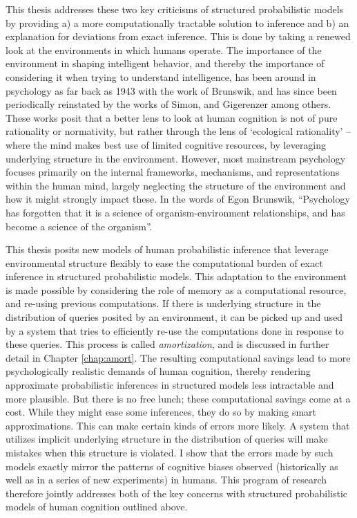 This thesis addresses these two key criticisms of structured probabilistic models by providing a) a more computationally tractable solution to inference and b) an explanation for deviations from exact inference. This is done by taking a renewed look at the environments in which humans operate. The importance of the environment in shaping intelligent behavior, and thereby the importance of considering it when trying to understand intelligence, has been around in psychology as far back as 1943 with the work of Brunswik\citep{brunswik1943organismic}, and has since been periodically reinstated by the works of Simon\citep{simon1956rational}, %
and Gigerenzer \citep{gigerenzer1999simple} among others. These works posit that a better lens to look at human cognition is not of pure rationality or normativity, but rather through the lens of `ecological rationality' -- where the mind makes best use of limited cognitive resources, by leveraging underlying structure in the environment. However, most mainstream psychology focuses primarily on the internal frameworks, mechanisms, and representations within the human mind, largely neglecting the structure of the environment and how it might strongly impact these. In the words of Egon Brunswik, ``Psychology has forgotten that it is a science of organism-environment relationships, and has become a science of the organism''.  

This thesis posits new models of human probabilistic inference that leverage environmental structure flexibly to ease the computational burden of exact inference in structured probabilistic models. This adaptation to the environment is made possible by considering the role of memory as a computational resource, and re-using previous computations. If there is underlying structure in the distribution of queries posited by an environment, it can be picked up and used by a system that tries to efficiently re-use the computations done in response to these queries. This process is called \textit{amortization}, and is discussed in further detail in Chapter \ref{chap:amort}. %
The resulting computational savings lead to more psychologically realistic demands of human cognition, thereby rendering approximate probabilistic inferences in structured models less intractable and more plausible. But there is no free lunch; these computational savings come at a cost. While they might ease some inferences, they do so by making smart approximations. This can make certain kinds of errors more likely. A system that utilizes implicit underlying structure in the distribution of queries will make mistakes when this structure is violated. I show that the errors made by such models exactly mirror the patterns of cognitive biases observed (historically as well as in a series of new experiments) in humans. This program of research therefore jointly addresses both of the key concerns with structured probabilistic models of human cognition outlined above.

